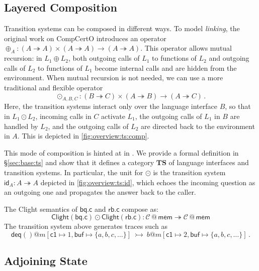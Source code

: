 \documentclass[acmsmall,screen,review,anonymous]{acmart}
\newcommand{\kw}[1]{\ensuremath{ \mathsf{#1} }}
\begin{document}
\subsection{Layered Composition} %

Transition systems can be composed in different ways.
To model \emph{linking}, the original work on CompCertO introduces an operator
$
  {\oplus}_A : (A \twoheadrightarrow A) \times (A \twoheadrightarrow A)
  \rightarrow (A \twoheadrightarrow A)
$.
This operator allows mutual recursion:
in $L_1 \oplus L_2$, both
outgoing calls of $L_1$ to functions of $L_2$ and
outgoing calls of $L_2$ to functions of $L_1$
become internal calls and are hidden from the environment.
When mutual recursion is not needed,
we can use a more traditional and flexible operator
\[
  {\odot}_{A,B,C} :
    (B \twoheadrightarrow C) \times
    (A \twoheadrightarrow B) \rightarrow
    (A \twoheadrightarrow C)
  \,.
\]
Here,
the transition systems interact only over
the language interface $B$,
so that in $L_1 \odot L_2$,
incoming calls in $C$ activate $L_1$,
the outgoing calls of $L_1$ in $B$ are handled by $L_2$, and
the outgoing calls of $L_2$
are directed back to the environment in $A$.
This is depicted in \autoref{fig:overview:ts:comp}.

This mode of composition is hinted at in \citet{compcerto}.
We provide a formal definition in \S\ref{sec:base:ts}
and show that
it defines a category $\mathbf{TS}$ of
language interfaces and transition systems.
In particular,
the unit for $\odot$ is
the transition system $\kw{id}_A : A \twoheadrightarrow A$
depicted in \autoref{fig:overview:ts:id},
which echoes the incoming question as an outgoing one
and propagates the answer back to the caller.

\begin{example} %
The Clight semantics of $\kw{bq.c}$ and $\kw{rb.c}$
compose as:
\[
  \kw{Clight}(\kw{bq.c}) \odot \kw{Clight}(\kw{rb.c})
  :
  \mathcal{C} \mathbin@ \kw{mem} \twoheadrightarrow
  \mathcal{C} \mathbin@ \kw{mem}
\]
The transition system above generates traces such as
\[
  \kw{deq}()@m[\kw{c1}\mapsto 1, \kw{buf}\mapsto\{a,b,c,\ldots\}]
  \:\rightarrowtail\:
  b@m[\kw{c1} \mapsto 2, \kw{buf} \mapsto \{a, b, c, \ldots\}]
  \,.
\]
\end{example}


\subsection{Adjoining State} \label{sec:overview:slift} %
\end{document}

